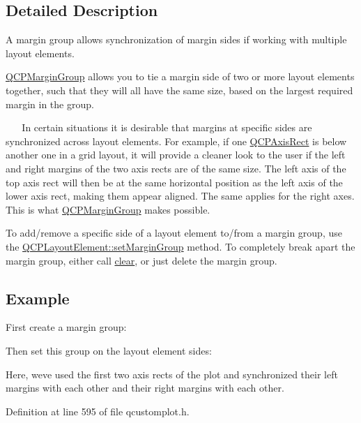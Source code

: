 \subsection{Detailed Description}
A margin group allows synchronization of margin sides if working with multiple layout elements. 

\hyperlink{class_q_c_p_margin_group}{Q\+C\+P\+Margin\+Group} allows you to tie a margin side of two or more layout elements together, such that they will all have the same size, based on the largest required margin in the group.

~\newline
~\newline
 In certain situations it is desirable that margins at specific sides are synchronized across layout elements. For example, if one \hyperlink{class_q_c_p_axis_rect}{Q\+C\+P\+Axis\+Rect} is below another one in a grid layout, it will provide a cleaner look to the user if the left and right margins of the two axis rects are of the same size. The left axis of the top axis rect will then be at the same horizontal position as the left axis of the lower axis rect, making them appear aligned. The same applies for the right axes. This is what \hyperlink{class_q_c_p_margin_group}{Q\+C\+P\+Margin\+Group} makes possible.

To add/remove a specific side of a layout element to/from a margin group, use the \hyperlink{class_q_c_p_layout_element_a516e56f76b6bc100e8e71d329866847d}{Q\+C\+P\+Layout\+Element\+::set\+Margin\+Group} method. To completely break apart the margin group, either call \hyperlink{class_q_c_p_margin_group_a144b67f216e4e86c3a3a309e850285fe}{clear}, or just delete the margin group.\hypertarget{class_q_c_p_margin_group_QCPMarginGroup-example}{}\subsection{Example}\label{class_q_c_p_margin_group_QCPMarginGroup-example}
First create a margin group\+: 
\begin{DoxyCodeInclude}
\end{DoxyCodeInclude}
Then set this group on the layout element sides\+: 
\begin{DoxyCodeInclude}
\end{DoxyCodeInclude}
Here, we\textquotesingle{}ve used the first two axis rects of the plot and synchronized their left margins with each other and their right margins with each other. 

Definition at line 595 of file qcustomplot.\+h.



